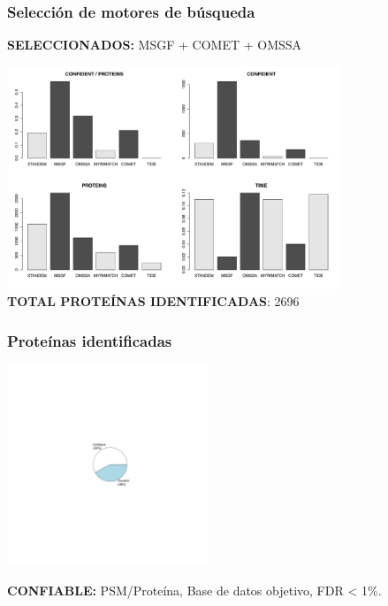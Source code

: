 \documentclass[10pt]{beamer}
\begin{document}
\begin{frame}
\frametitle{Selección de motores de búsqueda}
\begin{center}
\textbf{SELECCIONADOS:} MSGF + COMET + OMSSA 
\end{center}
\begin{center}
\includegraphics[width=10cm]{imagenes/ENGINES}\\
\textbf{TOTAL PROTEÍNAS IDENTIFICADAS}: 2696
\end{center}
\end{frame}
\begin{frame}
\frametitle{Proteínas identificadas}
\begin{center}
\includegraphics[width=6cm]{imagenes/Proteins}
\end{center}
\begin{center}
\textbf{CONFIABLE:} PSM/Proteína, Base de datos objetivo, FDR < 1\%.
\end{center}
\end{frame}
\end{document}
